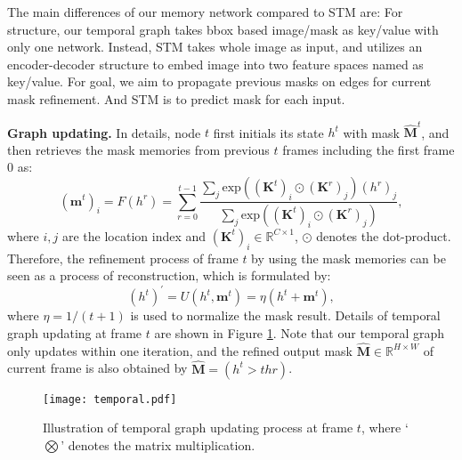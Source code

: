 \documentclass[letterpaper]{article} \usepackage{aaai21}  \usepackage{times}  \usepackage{helvet} \usepackage{courier}  \usepackage[hyphens]{url}  \usepackage{graphicx} \urlstyle{rm} \def\UrlFont{\rm}  \usepackage{graphicx}  \usepackage{natbib}  \usepackage{caption} \frenchspacing  \setlength{\pdfpagewidth}{8.5in}  \setlength{\pdfpageheight}{11in}  \usepackage{amsmath}
\begin{document}
The main differences of our memory network compared to STM \cite{oh2019video} are:
For structure, our temporal graph takes bbox based image/mask as key/value with only one network. Instead, STM takes whole image as input, and utilizes an encoder-decoder structure to embed image into two feature spaces named as key/value. For goal, we aim to propagate previous masks on edges for current mask refinement. And STM is to predict mask for each input.

\noindent \textbf{Graph updating.}
In details, node $t$ first initials its state $h^t$ with mask $\widehat{\bm{M}}^t$, and then retrieves the mask memories from previous $t$ frames including the first frame $0$ as:
\begin{equation}
    (\bm{m}^t)_i = F(h^r) = \sum_{r=0}^{t-1} \frac{\sum_j{\text{exp}((\bm{K}^t)_i \odot (\bm{K}^r)_j) (h^r)_j}}{\sum_j{\text{exp}((\bm{K}^t)_i \odot (\bm{K}^r)_j)}}, 
\end{equation}
where $i,j$ are the location index and $(\bm{K}^t)_i \in \mathbb{R}^{C\times 1}$, $\odot$ denotes the dot-product. Therefore, the refinement process of frame $t$ by using the mask memories can be seen as a process of reconstruction, which is formulated by:
\begin{equation}
    (h^t)^{'}  = U(h^t, \bm{m}^t) = \eta(h^t + \bm{m}^t),
\end{equation}
where $\eta=1/(t+1)$ is used to normalize the mask result. Details of temporal graph updating at frame $t$ are shown in Figure \ref{fig:temporal}. Note that our temporal graph only updates within one iteration, and the refined output mask $\widehat{\bm{M}} \in \mathbb{R}^{H \times W}$ of current frame is also obtained by $\widehat{\bm{M}} = (h^t>thr)$.

\begin{figure}[t]
\centering
\texttt{[image: temporal.pdf]}
\caption{Illustration of temporal graph updating process at frame $t$, where `$\bigotimes$' denotes the matrix multiplication.}
\label{fig:temporal}
\vspace{-10pt}
\end{figure}
\end{document}
